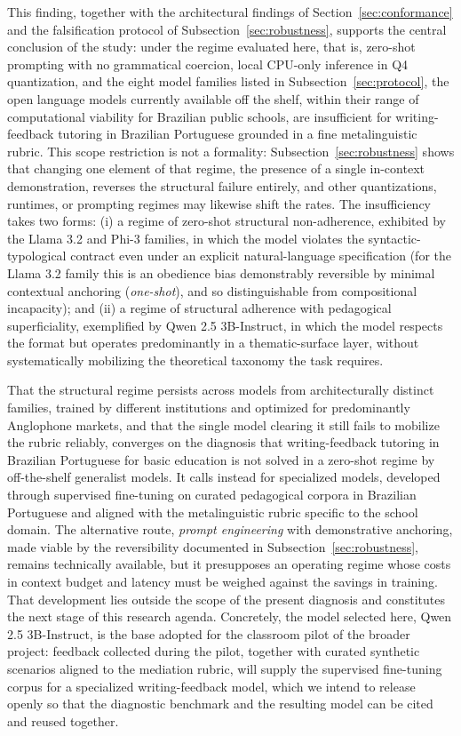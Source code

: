 \documentclass{sbc2023}%
\begin{document}
This finding, together with the architectural findings of Section~\ref{sec:conformance} and the falsification protocol of Subsection~\ref{sec:robustness}, supports the central conclusion of the study: under the regime evaluated here, that is, zero-shot prompting with no grammatical coercion, local CPU-only inference in Q4 quantization, and the eight model families listed in Subsection~\ref{sec:protocol}, the open language models currently available off the shelf, within their range of computational viability for Brazilian public schools, are insufficient for writing-feedback tutoring in Brazilian Portuguese grounded in a fine metalinguistic rubric. This scope restriction is not a formality: Subsection~\ref{sec:robustness} shows that changing one element of that regime, the presence of a single in-context demonstration, reverses the structural failure entirely, and other quantizations, runtimes, or prompting regimes may likewise shift the rates. The insufficiency takes two forms: (i) a regime of zero-shot structural non-adherence, exhibited by the Llama 3.2 and Phi-3 families, in which the model violates the syntactic-typological contract even under an explicit natural-language specification (for the Llama 3.2 family this is an obedience bias demonstrably reversible by minimal contextual anchoring (\textit{one-shot}), and so distinguishable from compositional incapacity); and (ii) a regime of structural adherence with pedagogical superficiality, exemplified by Qwen 2.5 3B-Instruct, in which the model respects the format but operates predominantly in a thematic-surface layer, without systematically mobilizing the theoretical taxonomy the task requires.

That the structural regime persists across models from architecturally distinct families, trained by different institutions and optimized for predominantly Anglophone markets, and that the single model clearing it still fails to mobilize the rubric reliably, converges on the diagnosis that writing-feedback tutoring in Brazilian Portuguese for basic education is not solved in a zero-shot regime by off-the-shelf generalist models. It calls instead for specialized models, developed through supervised fine-tuning on curated pedagogical corpora in Brazilian Portuguese and aligned with the metalinguistic rubric specific to the school domain. The alternative route, \textit{prompt engineering} with demonstrative anchoring, made viable by the reversibility documented in Subsection~\ref{sec:robustness}, remains technically available, but it presupposes an operating regime whose costs in context budget and latency must be weighed against the savings in training. That development lies outside the scope of the present diagnosis and constitutes the next stage of this research agenda. Concretely, the model selected here, Qwen 2.5 3B-Instruct, is the base adopted for the classroom pilot of the broader project: feedback collected during the pilot, together with curated synthetic scenarios aligned to the mediation rubric, will supply the supervised fine-tuning corpus for a specialized writing-feedback model, which we intend to release openly so that the diagnostic benchmark and the resulting model can be cited and reused together.
\end{document}

